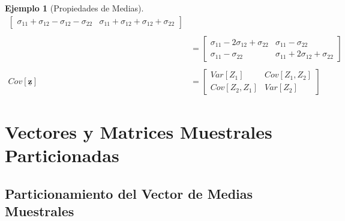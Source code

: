 \documentclass[
]{book}
\theoremstyle{definition}
\theoremstyle{definition}
\newtheorem{example}{Ejemplo}[chapter]
\theoremstyle{definition}
\theoremstyle{definition}
\theoremstyle{remark}
\begin{document}
\begin{example}[Propiedades de Medias]
\begin{align*}
\begin{bmatrix}
\sigma_{11}+\sigma_{12}-\sigma_{12}-\sigma_{22} &
  \sigma_{11}+ \sigma_{12}+\sigma_{12}+\sigma_{22}
\end{bmatrix}\\ \\
&=
\begin{bmatrix}
\sigma_{11}-2\sigma_{12}+\sigma_{22} & \sigma_{11}-\sigma_{22}\\
\sigma_{11}-\sigma_{22} &
\sigma_{11}+ 2\sigma_{12}+\sigma_{22}
\end{bmatrix}\\  \\
Cov[\underline{\mathbf{z}}]&=\begin{bmatrix}
Var[Z_1] & Cov[Z_1,Z_2]\\
Cov[Z_2,Z_1] & Var[Z_2]
\end{bmatrix}
\end{align*}
\end{example}

\hypertarget{vectores-y-matrices-muestrales-particionadas}{%
\section{Vectores y Matrices Muestrales Particionadas}\label{vectores-y-matrices-muestrales-particionadas}}

\hypertarget{particionamiento-del-vector-de-medias-muestrales}{%
\subsection{Particionamiento del Vector de Medias Muestrales}\label{particionamiento-del-vector-de-medias-muestrales}}
\end{document}
